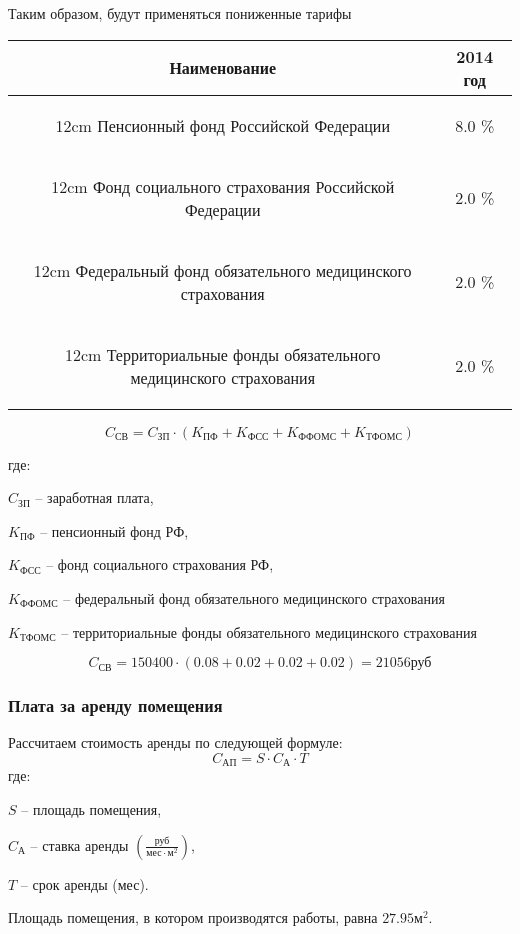 Таким образом, будут применяться пониженные тарифы

\newcommand{\tp}[2]%
{
    \begin{tabpage}{#2}
    #1
    \end{tabpage}
}

\vspace{1em}

\begin{tabular}{|c|c|}
\hline
Наименование & 2014 год \\
\hline
\tp{Пенсионный фонд Российской Федерации}{12cm} & 8.0 \% \\
\hline
\tp{Фонд социального страхования Российской Федерации}{12cm} & 2.0 \% \\
\hline
\tp{Федеральный фонд обязательного медицинского страхования}{12cm} & 2.0 \% \\
\hline
\tp{Территориальные фонды обязательного медицинского страхования}{12cm} & 2.0 \% \\
\hline
\end{tabular}

$$C_\text{СВ} = C_\text{ЗП} \cdot ( K_\text{ПФ} + K_\text{ФСС} +
K_\text{ФФОМС} + K_\text{ТФОМС} )$$

где:

$C_\text{ЗП}$ -- заработная плата,

$K_\text{ПФ}$ -- пенсионный фонд РФ,

$K_\text{ФСС}$ -- фонд социального страхования РФ,

$K_\text{ФФОМС}$ -- федеральный фонд обязательного медицинского страхования

$K_\text{ТФОМС}$ -- территориальные фонды обязательного медицинского страхования

$$C_\text{СВ} = 150400 \cdot ( 0.08 + 0.02 + 0.02 + 0.02 ) = 21056 \text{руб}$$

\subsubsection{Плата за аренду помещения}

Рассчитаем стоимость аренды по следующей формуле:
$$ C_\text{АП} = S \cdot C_\text{А} \cdot T $$
где:

$S$ -- площадь помещения,

$C_\text{А}$ -- ставка аренды $\left(\frac{\text{руб}}{\text{мес}\cdot\text{м}^2}\right)$,

$T$ -- срок аренды (мес).

Площадь помещения, в котором производятся работы, равна $27.95 \text{м}^2$.

